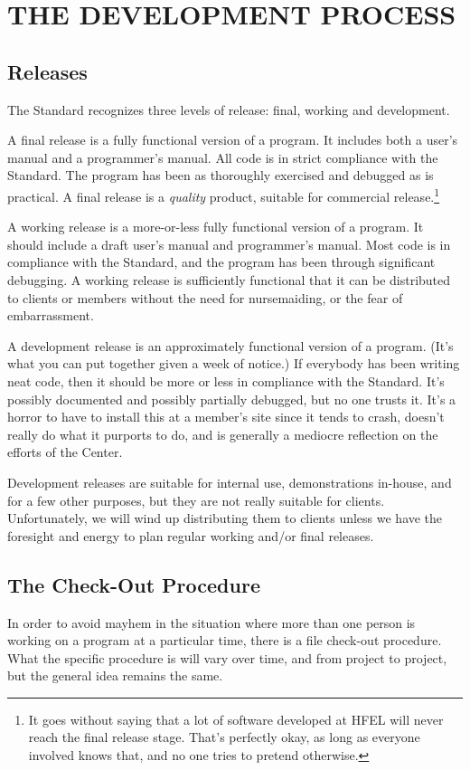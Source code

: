\section{THE DEVELOPMENT PROCESS}
\subsection{Releases}
The Standard recognizes three levels of release: final, working and
development.

A final release is a fully functional version of a program.  It
includes both a user's manual and a programmer's manual.  All code is
in strict compliance with the Standard.  The program has been as
thoroughly exercised and debugged as is practical.  A final release is
a {\em quality} product, suitable for commercial release.\footnote{It
goes without saying that a lot of software developed at HFEL will
never reach the final release stage.  That's perfectly okay, as long
as everyone involved knows that, and no one tries to pretend
otherwise.}


A working release is a more-or-less fully functional version of a
program.  It should include a draft user's manual and programmer's
manual.  Most code is in compliance with the Standard, and the program
has been through significant debugging.  A working release is
sufficiently functional that it can be distributed to clients or
members without the need for nursemaiding, or the fear of
embarrassment.

A development release is an approximately functional version of a
program.  (It's what you can put together given a week of notice.)  If
everybody has been writing neat code, then it should be more or less
in compliance with the Standard.  It's possibly documented and
possibly partially debugged, but no one trusts it.  It's a horror to
have to install this at a member's site since it tends to crash,
doesn't really do what it purports to do, and is generally a mediocre
reflection on the efforts of the Center.

Development releases are suitable for internal use, demonstrations
in-house, and for a few other purposes, but they are not really
suitable for clients.  Unfortunately, we will wind up distributing
them to clients unless we have the foresight and energy to plan
regular working and/or final releases.

\subsection{The Check-Out Procedure}
In order to avoid mayhem in the situation where more than one person
is working on a program at a particular time, there is a file
check-out procedure.  What the specific procedure is will vary over
time, and from project to project, but the general idea remains the
same.

